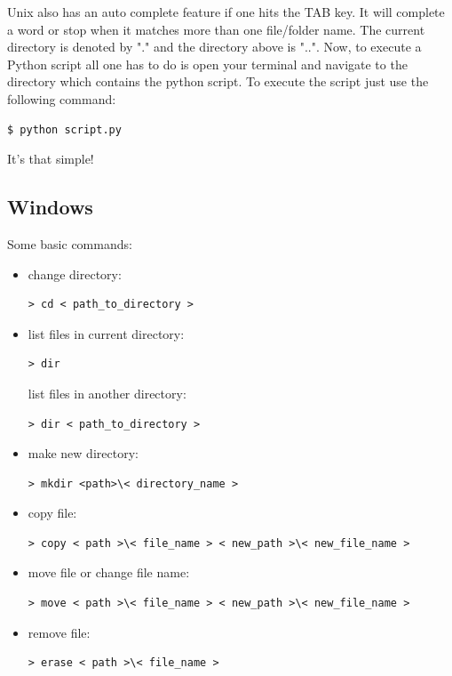 \documentclass{SciPost}
\newcommand\0{\scalebox{-1}[1]{0}}
\let\svttfamily\ttfamily
\renewcommand\ttfamily{\svttfamily\catcode`0=\active }
\begin{document}
\begin{appendix}
\begin{itemize}
	\end{itemize}
	Unix also has an auto complete feature if one hits the TAB key. It will complete a word or stop when it matches more than one file/folder name. The current directory is denoted by "." and the directory above is "..".
	Now, to execute a Python script all one has to do is open your terminal and navigate to the directory which contains the python script. To execute the script just use the following command:
	\begin{lstlisting}[numbers=none,keywordstyle=\ttfamily]
	$ python script.py
	\end{lstlisting}
	It's that simple!
	
	\subsection{Windows}
	Some basic commands:
	
	\begin{itemize}
		\item change directory:
		\begin{lstlisting}[numbers=none,keywordstyle=\ttfamily]
		> cd < path_to_directory >
		\end{lstlisting}
		\item list files in current directory:
		\begin{lstlisting}[numbers=none,keywordstyle=\ttfamily]
		> dir
		\end{lstlisting}
		list files in another directory:
		\begin{lstlisting}[numbers=none,keywordstyle=\ttfamily]
		> dir < path_to_directory >
		\end{lstlisting}
		\item make new directory:
		\begin{lstlisting}[numbers=none,keywordstyle=\ttfamily]
		> mkdir <path>\< directory_name >
		\end{lstlisting}
		\item copy file:
		\begin{lstlisting}[numbers=none,keywordstyle=\ttfamily]
		> copy < path >\< file_name > < new_path >\< new_file_name >
		\end{lstlisting}
		\item move file or change file name:
		\begin{lstlisting}[numbers=none,keywordstyle=\ttfamily]
		> move < path >\< file_name > < new_path >\< new_file_name >
		\end{lstlisting}
		\item remove file:
		\begin{lstlisting}[numbers=none,keywordstyle=\ttfamily]
		> erase < path >\< file_name >
		\end{lstlisting}
		

\end{itemize}
\end{appendix}
\end{document}
